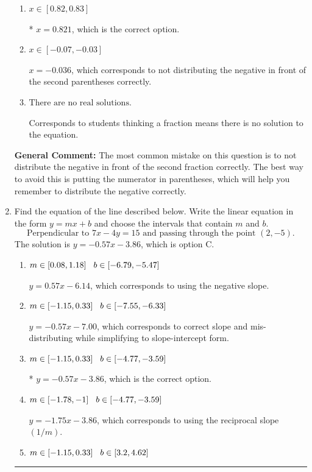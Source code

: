 \documentclass{extbook}[14pt]
\newcommand{\litem}[1]{\item #1

\rule{\textwidth}{0.4pt}}
\begin{document}
\begin{enumerate}
{\begin{enumerate}[label=\Alph*.]
$x = 0.000$, which corresponds to getting the negative of the actual solution.
\item \( x \in [0.82, 0.83] \)

* $x = 0.821$, which is the correct option.
\item \( x \in [-0.07, -0.03] \)

$x = -0.036$, which corresponds to not distributing the negative in front of the second parentheses correctly.
\item \( \text{There are no real solutions.} \)

Corresponds to students thinking a fraction means there is no solution to the equation.
\end{enumerate}

\textbf{General Comment:} The most common mistake on this question is to not distribute the negative in front of the second fraction correctly. The best way to avoid this is putting the numerator in parentheses, which will help you remember to distribute the negative correctly.
}
\litem{
Find the equation of the line described below. Write the linear equation in the form $ y=mx+b $ and choose the intervals that contain $m$ and $b$.
\[ \text{Perpendicular to } 7 x - 4 y = 15 \text{ and passing through the point } (2, -5). \]The solution is \( y = -0.57x - 3.86 \), which is option C.\begin{enumerate}[label=\Alph*.]
\item \( m \in [0.08, 1.18] \hspace*{3mm} b \in [-6.79, -5.47] \)

 $y = 0.57x - 6.14$, which corresponds to using the negative slope.
\item \( m \in [-1.15, 0.33] \hspace*{3mm} b \in [-7.55, -6.33] \)

 $y = -0.57x - 7.00$, which corresponds to correct slope and mis-distributing while simplifying to slope-intercept form.
\item \( m \in [-1.15, 0.33] \hspace*{3mm} b \in [-4.77, -3.59] \)

* $y = -0.57x - 3.86$, which is the correct option.
\item \( m \in [-1.78, -1] \hspace*{3mm} b \in [-4.77, -3.59] \)

 $y = -1.75x - 3.86$, which corresponds to using the reciprocal slope $(1/m)$.
\item \( m \in [-1.15, 0.33] \hspace*{3mm} b \in [3.2, 4.62] \)


\end{enumerate}}
\end{enumerate}
\end{document}
